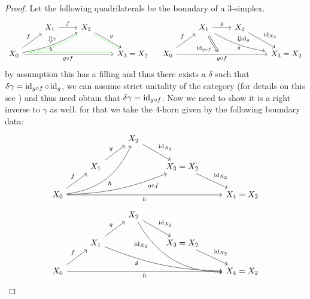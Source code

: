 \begin{proof}
	Let the following quadrilaterals be the boundary of a 3-simplex.
	\[
	\begin{tikzcd}
		&
		X_1
		\ar[r , " f " ]
		&
		X_2
		\ar[rd, " g "]
		\ar[rd, green, dash, dashed, shift right]
		\\
		X_0
		\ar[rrr, green, dash, dashed, shift left,
		start anchor={[xshift=2ex]}]
		\ar[rru,bend right=10," h "'{name=U, below}]
		\ar[rru, green, dash, dashed, shift right, bend right=10, 
		start anchor={[xshift=2ex]},
		start anchor={[yshift=0.5ex]}]
		\ar[ru, " f " ]
		\ar[rrr, " g \circ f "']
		\arrow[Rightarrow, shorten=3, from=ru, to=U, "\gamma"]
		&&&
		X_3 = X_2
	\end{tikzcd}
	\quad
	\begin{tikzcd}
		&
		X_1
		\ar[r , " g " ]
		\ar[rrd, bend right=10,shorten=3," g "{name=D, below}]
		&
		X_2
		\ar[rd, "\id_{ X_2 } "]
		\ar[Rightarrow, to=D,shorten=3, " \id_g "]
		\\
		X_0
		\ar[ru, " f " ]
		\ar[rrr, " g \circ f " {name=L, below}]
		\ar[Rightarrow,shorten=3, from=ur, to=L, "\id_{ g \circ f } "']
		&&&
		X_3 = X_2
	\end{tikzcd}
	\]
	by assumption this has a filling and thus there exists a $ \delta $ such that $ \delta \gamma = \operatorname{id}_{ g \circ f } \circ \operatorname{id}_g $, we can assume strict unitality of the category (for details on this see \cite{kerodon}) and thus need obtain that $ \delta \gamma = \operatorname{id}_{ g \circ f } $. 
	Now we need to show it is a right inverse to $ \gamma $ as well. 
	for that we take the 4-horn given by the following boundary data:
	\[
	\begin{tikzcd}
		&& 
		X_2 
		\ar[rd, " \id_{ X_2 } "]
		\\
		&
		X_1
		\ar[ru, "g"]
		&&
		X_3 = X_2
		\ar[rd, " \id_{X_2} "]
		\\
		X_0 
		\ar[ru, " f "]
		\ar[rrrr, " h "']
		\ar[rruu, bend right, " h "']
		\ar[rrru, bend right = 10, " g \circ f "' pos = 0.8]
		&&&&
		X_4 = X_2
	\end{tikzcd}
	\]
	\[
	\begin{tikzcd}
		&& 
		X_2 
		\ar[rd, " \id_{ X_2 } "]
		\ar[rrdd, bend right=30, " \id_{ X_2 } "' pos = 0.2]
		\\
		&
		X_1
		\ar[rrrd, bend right = 10, " g "' pos = 0.3]
		\ar[ru, "g"]
		&&
		X_3 = X_2
		\ar[rd, " \id_{X_2} "]
		\\
		X_0 
		\ar[ru, " f "]
		\ar[rrrr, " h "']
		&&&&
		X_4 = X_2
	\end{tikzcd}
	\]
	\[
\]
\end{proof}
